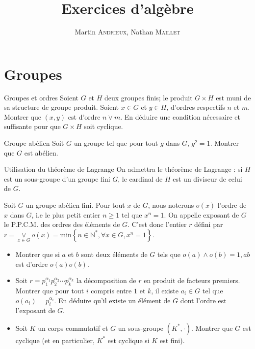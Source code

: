 \documentclass[french, a4paper, 11pt]{article}
\title{Exercices d'algèbre}
\author{Martin \textsc{Andrieux}, Nathan \textsc{Maillet}}
\date{}
\newcommand{\N}{\mathbb{N}}   %
\begin{document}
\maketitle
\section*{Groupes}
\begin{cadre}{Groupes et ordres}
  Soient \(G\) et \(H\) deux groupes finis; le produit \(G\times H\) est muni de sa structure de groupe produit.
  Soient \(x\in G\) et \(y\in H\), d'ordres respectifs \(n\) et \(m\). Montrer que \((x,y)\) est d'ordre \(n\vee m\).
  En déduire une condition nécessaire et suffisante pour que \(G\times H\) soit cyclique.
\end{cadre}

\begin{cadre}{Groupe abélien}
  Soit \(G\) un groupe tel que pour tout \(g\) dans \(G\), \(g^{2} = 1\). Montrer que \(G\) est abélien.
\end{cadre}

\begin{cadre}{Utilisation du théorème de Lagrange}
    On admettra le théorème de Lagrange : si $H$ est un sous-groupe d'un groupe fini $G$, le cardinal de $H$ est un diviseur
    de celui de $G$.
    
    
    Soit $G$ un groupe abélien fini. Pour tout $x$ de $G$, nous noterons $o(x)$ l'ordre de $x$ dans $G$, i.e le plus petit
    entier $n \geq 1$ tel que $x^n=1$. On appelle exposant de $G$ le P.P.C.M. des ordres des éléments de $G$. C'est donc
    l'entier $r$ défini par \(r=\underset{x \in G}{\vee} o(x)=\text{min}\left\{n \in \N^*, \forall x \in G, x^n=1\right\}\).
    \begin{itemize}[label=$\bullet$]
        \item Montrer que si $a$ et $b$ sont deux éléments de $G$ tels que \(o(a) \wedge o(b)=1, ab\) est d'ordre \(o(a)o(b)\).
        \item Soit \(r=p_1^{\alpha_1}p_2^{\alpha_2} \cdots p_k^{\alpha_k}\) la décomposition de $r$ en produit de facteurs premiers.
        Montrer que pour tout $i$ compris entre $1$ et $k$, il existe $a_i \in G$ tel que \(o(a_i)=p_i^{\alpha_i}\).
        En déduire qu'il existe un élément de $G$ dont l'ordre est l'exposant de $G$.    
        \item Soit $K$ un corps commutatif et $G$ un sous-groupe \((K^*,\cdot)\). Montrer que $G$ est cyclique
        (et en particulier, $K^*$ est cyclique si $K$ est fini). 
    \end{itemize}   
\end{cadre}
\end{document}
